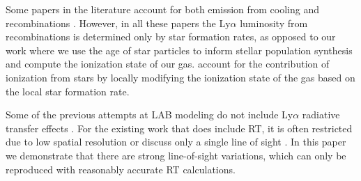 Some papers in the literature account for both emission from cooling and recombinations \citep{Cen2013, Furlanetto2005, Geach2016, Smailagi2016}.
However, in all these papers the Ly$\alpha$ luminosity from recombinations is determined only by star formation rates, as opposed to our work where we use the age of star particles to inform stellar population synthesis and compute the ionization state of our gas.
\citet{Geach2016} account for the contribution of ionization from stars by locally modifying the ionization state of the gas based on the local star formation rate.

Some of the previous attempts at LAB modeling do not include Ly$\alpha$ radiative transfer effects \citep{Fardal2001, Furlanetto2005, Goerdt2010, Smailagi2016, Rosdahl2012}.
For the existing work that does include RT, it is often restricted due to low spatial resolution \citep{Cen2013} or discuss only a single line of sight \citep{Cantalupo2005}.
In this paper we demonstrate that there are strong line-of-sight variations, which can only be reproduced with reasonably accurate RT calculations.

